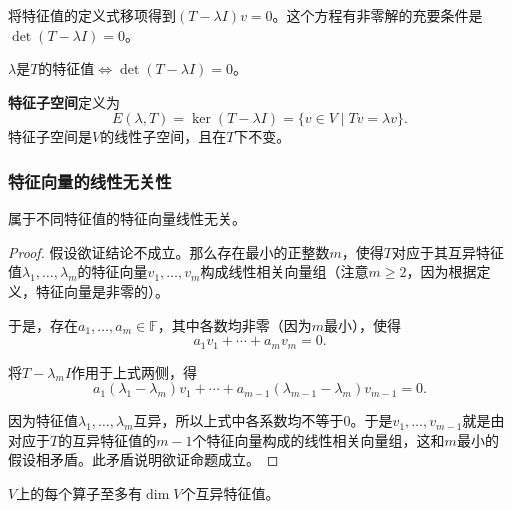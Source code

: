 将特征值的定义式移项得到$(T - \lambda I)v = 0$。这个方程有非零解的充要条件是$\det(T - \lambda I) = 0$。

\begin{theorem}
    $\lambda$是$T$的特征值$\iff \det(T - \lambda I) = 0$。
\end{theorem}

\begin{definition}[特征子空间]
    \textbf{特征子空间}定义为
    \begin{equation}
        E(\lambda, T) = \ker(T - \lambda I) = \{v \in V \mid Tv = \lambda v\}.
    \end{equation}
    特征子空间是$V$的线性子空间，且在$T$下不变。
\end{definition}

\subsubsection{特征向量的线性无关性}

\begin{theorem}
    属于不同特征值的特征向量线性无关。
\end{theorem}

\begin{proof}
    假设欲证结论不成立。那么存在最小的正整数$m$，使得$T$对应于其互异特征值$\lambda_1, \ldots, \lambda_m$的特征向量$v_1, \ldots, v_m$构成线性相关向量组（注意$m \geq 2$，因为根据定义，特征向量是非零的）。

    于是，存在$a_1, \ldots, a_m \in \mathbb{F}$，其中各数均非零（因为$m$最小），使得
    \begin{equation}
        a_1 v_1 + \cdots + a_m v_m = 0.
    \end{equation}

    将$T - \lambda_m I$作用于上式两侧，得
    \begin{equation}
        a_1(\lambda_1 - \lambda_m)v_1 + \cdots + a_{m-1}(\lambda_{m-1} - \lambda_m)v_{m-1} = 0.
    \end{equation}

    因为特征值$\lambda_1, \ldots, \lambda_m$互异，所以上式中各系数均不等于$0$。于是$v_1, \ldots, v_{m-1}$就是由对应于$T$的互异特征值的$m-1$个特征向量构成的线性相关向量组，这和$m$最小的假设相矛盾。此矛盾说明欲证命题成立。
\end{proof}

\begin{corollary}
    $V$上的每个算子至多有$\dim V$个互异特征值。
\end{corollary}

